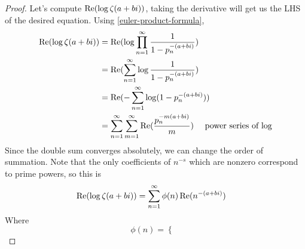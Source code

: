 \documentclass{homework}
\begin{document}
                                                                                                  \begin{proof}
                                                                                                  Let's compute $\operatorname{Re}(\log\zeta(a+bi))$, taking the derivative will get us the LHS of the desired equation. Using \ref{euler-product-formula},
                                                                                                  \begin{align*}
                                                                                                  \operatorname{Re}(\log\zeta(a+bi))&= \operatorname{Re}(\log \prod_{n=1}^\infty \frac{1}{1-p_n^{-(a+bi)}})\\
                                                                                                  &= \operatorname{Re}(\sum_{n=1}^\infty \log \frac{1}{1-p_n^{-(a+bi)}})\\
                                                                                                  &= \operatorname{Re}(-\sum_{n=1}^\infty \log (1-p_n^{-(a+bi)}))\\
                                                                                                  &= \sum_{n=1}^\infty \sum_{m=1}^\infty \operatorname{Re}(\frac{p_n^{-m(a+bi)}}{m}) \quad \text{ power series of log}\\
                                                                                                  \end{align*}
                                                                                                  Since the double sum converges absolutely, we can change the order of summation. Note that the only coefficients of $n^{-s}$ which are nonzero correspond to prime powers, so this is
                                                                                                  \begin{align*}
                                                                                                  \operatorname{Re}(\log\zeta(a+bi)) &= \sum_{n=1}^\infty \phi(n)\operatorname{Re}(n^{-(a+bi)})
                                                                                                  \end{align*}
                                                                                                  Where 
                                                                                                  \[
                                                                                                  \phi(n) = \begin{cases}

\end{cases}\]
\end{proof}
\end{document}
